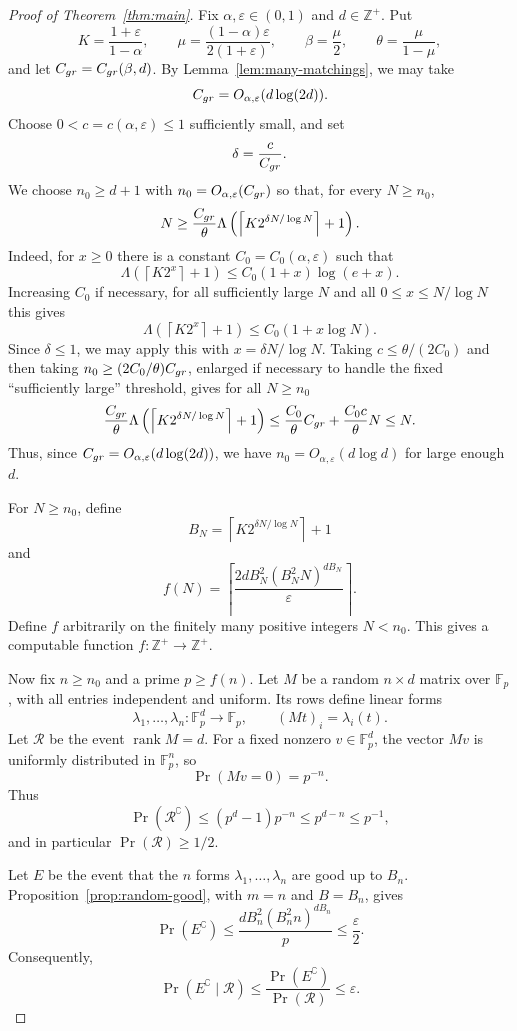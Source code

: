 \documentclass[10pt,a4paper]{amsart}
\newcommand{\Fp}{\mathbb{F}_p}
\newcommand{\Zpos}{\mathbb{Z}^{+}}
\DeclareMathOperator{\rank}{rank}
\begin{document}
\begin{proof}[Proof of Theorem~\ref{thm:main}]
Fix $\alpha,\varepsilon\in(0,1)$ and $d\in\Zpos$. Put
\[
K=\frac{1+\varepsilon}{1-\alpha},
\qquad
\mu=\frac{(1-\alpha)\varepsilon}{2(1+\varepsilon)},
\qquad
\beta=\frac\mu2,
\qquad
\theta=\frac{\mu}{1-\mu},
\]
and let $C_{\rm gr}=C_{\rm gr}(\beta,d)$. By Lemma~\ref{lem:many-matchings}, we may take
\[
C_{\rm gr}=O_{\alpha,\varepsilon}(d\log(2d)).
\]
Choose $0<c=c(\alpha,\varepsilon)\le1$ sufficiently small, and set
\[
\delta=\frac{c}{C_{\rm gr}}.
\]
We choose $n_0\ge d+1$ with $n_0=O_{\alpha,\varepsilon}(C_{\rm gr})$ so that, for every $N\ge n_0$,
\[
N\ge \frac{C_{\rm gr}}{\theta}\Lambda\left(\left\lceil K2^{\delta N/\log N}\right\rceil+1\right).
\]
Indeed, for $x\ge0$ there is a constant $C_0=C_0(\alpha,\varepsilon)$ such that
\[
\Lambda\left(\left\lceil K2^x\right\rceil+1\right)
\le C_0(1+x)\log(e+x).
\]
Increasing $C_0$ if necessary, for all sufficiently large $N$ and all $0\le x\le N/\log N$ this gives
\[
\Lambda\left(\left\lceil K2^x\right\rceil+1\right)
\le C_0(1+x\log N).
\]
Since $\delta\le1$, we may apply this with $x=\delta N/\log N$. Taking $c\le \theta/(2C_0)$ and then taking $n_0\ge (2C_0/\theta)C_{\rm gr}$, enlarged if necessary to handle the fixed ``sufficiently large'' threshold, gives for all $N\ge n_0$
\[
\frac{C_{\rm gr}}{\theta}\Lambda\left(\left\lceil K2^{\delta N/\log N}\right\rceil+1\right)
\le \frac{C_0}{\theta}C_{\rm gr}+\frac{C_0c}{\theta}N
\le N.
\]
Thus, since $C_{\rm gr}=O_{\alpha,\varepsilon}(d\log(2d))$, we have $n_0=O_{\alpha,\varepsilon}(d\log d)$ for large enough $d$.

For $N\ge n_0$, define
\[
B_N=\left\lceil K2^{\delta N/\log N}\right\rceil+1
\]
and
\[
f(N)=\left\lceil \frac{2dB_N^2(B_N^2N)^{dB_N}}{\varepsilon}\right\rceil.
\]
Define $f$ arbitrarily on the finitely many positive integers $N<n_0$. This gives a computable function $f:\Zpos\to\Zpos$.

Now fix $n\ge n_0$ and a prime $p\ge f(n)$. Let $M$ be a random $n\times d$ matrix over $\Fp$, with all entries independent and uniform. Its rows define linear forms
\[
\lambda_1,\ldots,\lambda_n:\Fp^d\to\Fp,
\qquad
(Mt)_i=\lambda_i(t).
\]
Let $\mathcal R$ be the event $\rank M=d$. For a fixed nonzero $v\in\Fp^d$, the vector $Mv$ is uniformly distributed in $\Fp^n$, so
\[
\Pr(Mv=0)=p^{-n}.
\]
Thus
\[
\Pr(\mathcal R^\complement)
\le (p^d-1)p^{-n}
\le p^{d-n}
\le p^{-1},
\]
and in particular $\Pr(\mathcal R)\ge 1/2$.

Let $E$ be the event that the $n$ forms $\lambda_1,\ldots,\lambda_n$ are good up to $B_n$. Proposition~\ref{prop:random-good}, with $m=n$ and $B=B_n$, gives
\[
\Pr(E^\complement)
\le
\frac{dB_n^2(B_n^2n)^{dB_n}}{p}
\le \frac{\varepsilon}{2}.
\]
Consequently,
\[
\Pr(E^\complement\mid\mathcal R)
\le \frac{\Pr(E^\complement)}{\Pr(\mathcal R)}
\le \varepsilon.
\]


\end{proof}
\end{document}
